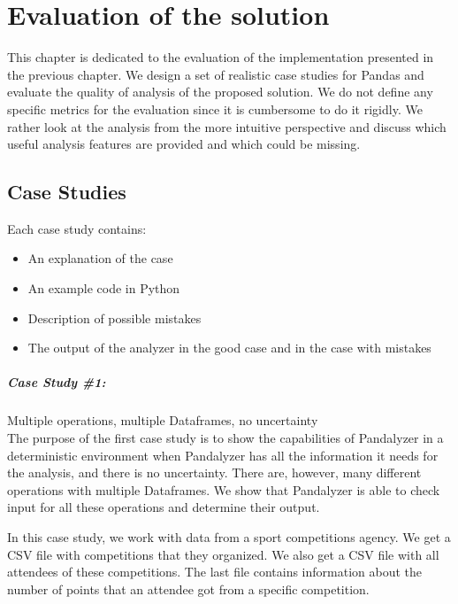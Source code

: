\chapter{Evaluation of the solution}\label{ch:evaluation-of-solution}

This chapter is dedicated to the evaluation of the implementation presented in the previous chapter.
We design a set of realistic case studies for Pandas and evaluate the quality of analysis of the proposed solution.
We do not define any specific metrics for the evaluation since it is cumbersome to do it rigidly.
We rather look at the analysis from the more intuitive perspective and discuss which useful analysis features are
provided and which could be missing.

\section{Case Studies}

Each case study contains:
\begin{itemize}
    \item An explanation of the case
    \item An example code in Python
    \item Description of possible mistakes
    \item The output of the analyzer in the good case and in the case with mistakes
\end{itemize}

\paragraph{Case Study \#1:} Multiple operations, multiple Dataframes, no uncertainty  \\

The purpose of the first case study is to show the capabilities of Pandalyzer in a deterministic environment when
Pandalyzer has all the information it needs for the analysis, and there is no uncertainty.
There are, however, many different operations with multiple Dataframes.
We show that Pandalyzer is able to check input for all these operations and determine their output.

In this case study, we work with data from a sport competitions agency.
We get a CSV file with competitions that they organized.
We also get a CSV file with all attendees of these competitions.
The last file contains information about the number of points that an attendee got from a specific competition.

